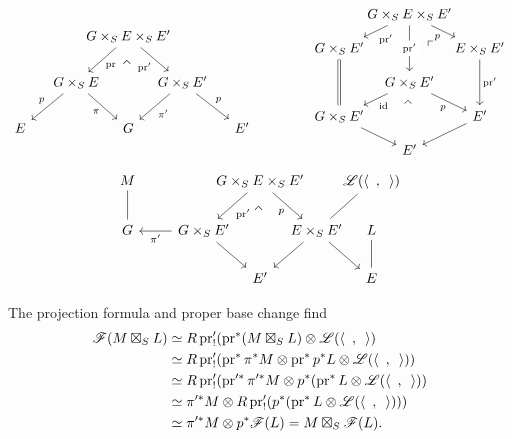 \documentclass[deligne.tex]{subfiles}
\begin{document}
\begin{ceqn}
\begin{equation*}
\begin{tikzcd}[column sep=small]
	&&[-30pt]G\times_SE\times_SE'\arrow[dl,"\pr"]\arrow[dr,"\pr'"']\arrow[dd,phantom,"{\rotatebox{45}{\text{$\urcorner$}}}",near start]&[-30pt] \\
	&G\times_SE\arrow[dl,"p"']\arrow[dr,"\pi"']
	&&G\times_SE'\arrow[dl,"\pi'"]\arrow[dr,"p"] \\
	E&&G&&E'
\end{tikzcd}
\qquad\qquad\begin{tikzcd}[row sep=small]
	&[-30pt]G\times_SE\times_SE'\arrow[dl,"\pr'"]\arrow[dr,"p"']\arrow[dd,"\pr'" description]
	\arrow[dddr,phantom,"\ulcorner",near start]
	&[-30pt] \\
	G\times_SE'\arrow[dd,equals]
	&&E\times_SE'\arrow[dd,"\pr'"] \\
	&G\times_SE'\arrow[dl,"\id"]\arrow[dr,"p"'] 
	\arrow[dd,phantom,"{\rotatebox{45}{\text{$\urcorner$}}}",near start] \\
	G\times_SE'\arrow[dr]&&E'\arrow[dl] \\
	&E'
\end{tikzcd}
\end{equation*}
\begin{equation*}\begin{tikzcd}[column sep=small]
	M\arrow[d,dash]&[10pt]&[-30pt]G\times_SE\times_SE'\arrow[dl,"\pr'"]\arrow[dr,"p"']
	\arrow[dd,phantom,"{\rotatebox{45}{\text{$\urcorner$}}}",near start]
	&[-30pt]&[-20pt]\mathscr L(\langle\enskip,\enskip\rangle)\arrow[dl,dash] \\
	G&G\times_SE'\arrow[l,"\pi'"]\arrow[dr]&&E\times_SE'\arrow[dr]\arrow[dl]
	&L\arrow[d,dash] \\
	&&E'&&E
\end{tikzcd}
\end{equation*}
\end{ceqn}
The projection formula and proper base change find
\begin{align*}
	\mathscr F(M\boxtimes_SL)
	&\simeq R\operatorname{pr}'_!(\operatorname{pr}^*(M\boxtimes_SL)\otimes\mathscr L(\langle\enskip,\enskip\rangle) \\
	&\simeq R\operatorname{pr}'_!(\operatorname{pr}^*\pi^*M\otimes\operatorname{pr}^*p^*L\otimes\mathscr L(\langle\enskip,\enskip\rangle)) \\
	&\simeq R\operatorname{pr}'_!(\operatorname{pr}'^*\pi'^*M\otimes p^*(\operatorname{pr}^*L\otimes\mathscr L(\langle\enskip,\enskip\rangle)) \\
	&\simeq \pi'^*M\otimes R\operatorname{pr}'_!(p^*(\operatorname{pr}^*L\otimes\mathscr L(\langle\enskip,\enskip\rangle))) \\
	&\simeq \pi'^*M\otimes p^*\mathscr F(L)
	=M\boxtimes_S\mathscr F(L).
\end{align*}
\end{document}
